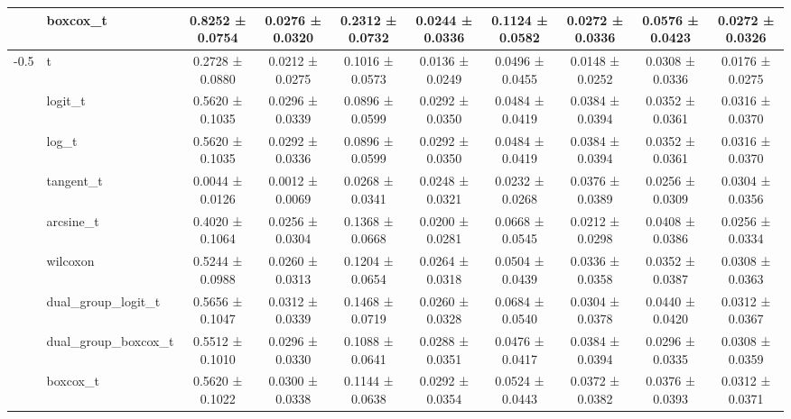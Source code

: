 \begin{table}[h]
\begin{tabular}{|c|l|c|c|c|c|c|c|c|c|}
                          & boxcox_t & 0.8252 ± 0.0754 & 0.0276 ± 0.0320 & 0.2312 ± 0.0732 & 0.0244 ± 0.0336 & 0.1124 ± 0.0582 & 0.0272 ± 0.0336 & 0.0576 ± 0.0423 & 0.0272 ± 0.0326 \\
\hline
\multirow{9}{*}{-0.5} & t & 0.2728 ± 0.0880 & 0.0212 ± 0.0275 & 0.1016 ± 0.0573 & 0.0136 ± 0.0249 & 0.0496 ± 0.0455 & 0.0148 ± 0.0252 & 0.0308 ± 0.0336 & 0.0176 ± 0.0275 \\
                          & logit_t & 0.5620 ± 0.1035 & 0.0296 ± 0.0339 & 0.0896 ± 0.0599 & 0.0292 ± 0.0350 & 0.0484 ± 0.0419 & 0.0384 ± 0.0394 & 0.0352 ± 0.0361 & 0.0316 ± 0.0370 \\
                          & log_t & 0.5620 ± 0.1035 & 0.0292 ± 0.0336 & 0.0896 ± 0.0599 & 0.0292 ± 0.0350 & 0.0484 ± 0.0419 & 0.0384 ± 0.0394 & 0.0352 ± 0.0361 & 0.0316 ± 0.0370 \\
                          & tangent_t & 0.0044 ± 0.0126 & 0.0012 ± 0.0069 & 0.0268 ± 0.0341 & 0.0248 ± 0.0321 & 0.0232 ± 0.0268 & 0.0376 ± 0.0389 & 0.0256 ± 0.0309 & 0.0304 ± 0.0356 \\
                          & arcsine_t & 0.4020 ± 0.1064 & 0.0256 ± 0.0304 & 0.1368 ± 0.0668 & 0.0200 ± 0.0281 & 0.0668 ± 0.0545 & 0.0212 ± 0.0298 & 0.0408 ± 0.0386 & 0.0256 ± 0.0334 \\
                          & wilcoxon & 0.5244 ± 0.0988 & 0.0260 ± 0.0313 & 0.1204 ± 0.0654 & 0.0264 ± 0.0318 & 0.0504 ± 0.0439 & 0.0336 ± 0.0358 & 0.0352 ± 0.0387 & 0.0308 ± 0.0363 \\
                          & dual_group_logit_t & 0.5656 ± 0.1047 & 0.0312 ± 0.0339 & 0.1468 ± 0.0719 & 0.0260 ± 0.0328 & 0.0684 ± 0.0540 & 0.0304 ± 0.0378 & 0.0440 ± 0.0420 & 0.0312 ± 0.0367 \\
                          & dual_group_boxcox_t & 0.5512 ± 0.1010 & 0.0296 ± 0.0330 & 0.1088 ± 0.0641 & 0.0288 ± 0.0351 & 0.0476 ± 0.0417 & 0.0384 ± 0.0394 & 0.0296 ± 0.0335 & 0.0308 ± 0.0359 \\
                          & boxcox_t & 0.5620 ± 0.1022 & 0.0300 ± 0.0338 & 0.1144 ± 0.0638 & 0.0292 ± 0.0354 & 0.0524 ± 0.0443 & 0.0372 ± 0.0382 & 0.0376 ± 0.0393 & 0.0312 ± 0.0371 \\
\hline

\end{tabular}
\end{table}
